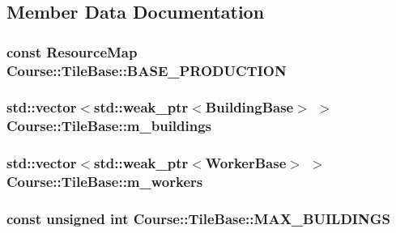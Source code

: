 \subsection{Member Data Documentation}
\hypertarget{classCourse_1_1TileBase_a62cd84d3705c6cca9afd0cb992dd4f02}{
\subsubsection[{B\-A\-S\-E\-\_\-\-P\-R\-O\-D\-U\-C\-T\-I\-O\-N}]{\setlength{\rightskip}{0pt plus 5cm}const {\bf Resource\-Map} Course\-::\-Tile\-Base\-::\-B\-A\-S\-E\-\_\-\-P\-R\-O\-D\-U\-C\-T\-I\-O\-N}}\label{classCourse_1_1TileBase_a62cd84d3705c6cca9afd0cb992dd4f02}
\hypertarget{classCourse_1_1TileBase_a69655ffca55e85254b87da39cf3b86b9}{
\subsubsection[{m\-\_\-buildings}]{\setlength{\rightskip}{0pt plus 5cm}std\-::vector$<$std\-::weak\-\_\-ptr$<${\bf Building\-Base}$>$ $>$ Course\-::\-Tile\-Base\-::m\-\_\-buildings\hspace{0.3cm}{\ttfamily [private]}}}\label{classCourse_1_1TileBase_a69655ffca55e85254b87da39cf3b86b9}
\hypertarget{classCourse_1_1TileBase_ad77f32b276a9c86637078dcea1e47a3d}{
\subsubsection[{m\-\_\-workers}]{\setlength{\rightskip}{0pt plus 5cm}std\-::vector$<$std\-::weak\-\_\-ptr$<${\bf Worker\-Base}$>$ $>$ Course\-::\-Tile\-Base\-::m\-\_\-workers\hspace{0.3cm}{\ttfamily [private]}}}\label{classCourse_1_1TileBase_ad77f32b276a9c86637078dcea1e47a3d}
\hypertarget{classCourse_1_1TileBase_a1c968e242544a994bfd54f73cd9027ea}{
\subsubsection[{M\-A\-X\-\_\-\-B\-U\-I\-L\-D\-I\-N\-G\-S}]{\setlength{\rightskip}{0pt plus 5cm}const unsigned int Course\-::\-Tile\-Base\-::\-M\-A\-X\-\_\-\-B\-U\-I\-L\-D\-I\-N\-G\-S}}\label{classCourse_1_1TileBase_a1c968e242544a994bfd54f73cd9027ea}
